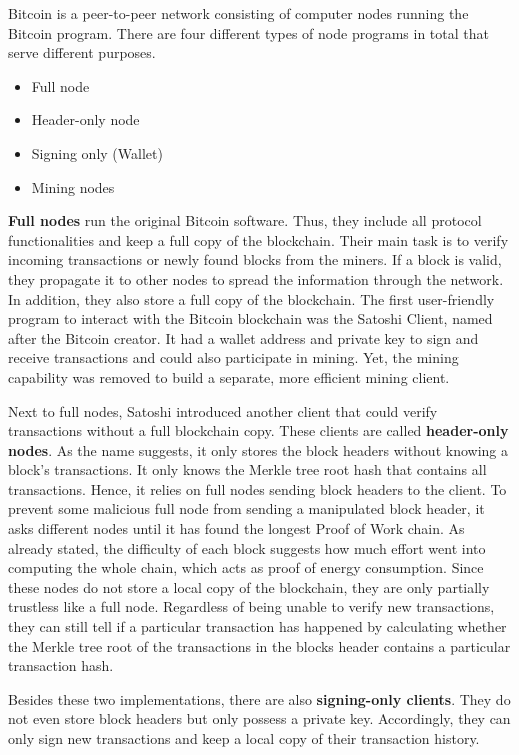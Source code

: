 Bitcoin is a peer-to-peer network consisting of computer nodes running the Bitcoin program.
There are four different types of node programs in total that serve different purposes.

\begin{itemize}
    \item Full node
    \item Header-only node
    \item Signing only (Wallet)
    \item Mining nodes
\end{itemize}

\textbf{Full nodes} run the original Bitcoin software. 
Thus, they include all protocol functionalities and keep a full copy of the blockchain.
Their main task is to verify incoming transactions or newly found blocks from the miners. 
If a block is valid, they propagate it to other nodes to spread the information through the network.
In addition, they also store a full copy of the blockchain.
The first user-friendly program to interact with the Bitcoin blockchain was the Satoshi Client, named after the Bitcoin creator.
It had a wallet address and private key to sign and receive transactions and could also participate in mining.
Yet, the mining capability was removed to build a separate, more efficient mining client. \cite{skudnov2012bitcoin}

Next to full nodes, Satoshi introduced another client that could verify transactions without a full blockchain copy.
These clients are called \textbf{header-only nodes}.
As the name suggests, it only stores the block headers without knowing a block's transactions.
It only knows the Merkle tree root hash that contains all transactions.
Hence, it relies on full nodes sending block headers to the client.
To prevent some malicious full node from sending a manipulated block header, it asks different nodes until it has found the longest Proof of Work chain.
As already stated, the difficulty of each block suggests how much effort went into computing the whole chain, which acts as proof of energy consumption. 
Since these nodes do not store a local copy of the blockchain, they are only partially trustless like a full node.
Regardless of being unable to verify new transactions, they can still tell if a particular transaction has happened by calculating whether the Merkle tree root of the transactions in the blocks header contains a particular transaction hash. \cite{nakamoto2008}

Besides these two implementations, there are also \textbf{signing-only clients}.
They do not even store block headers but only possess a private key.
Accordingly, they can only sign new transactions and keep a local copy of their transaction history. 

